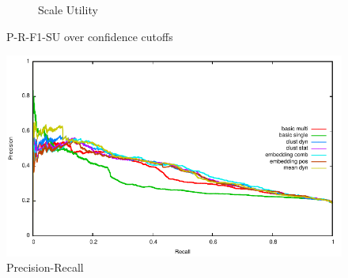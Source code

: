 \documentclass{sig-alternate}
\begin{document}
{{\begin{figure}[tb]
\begin{subfigure}[b]{\officialRunWidth}
			\caption{Scale Utility}
			\label{official:su}
    \end{subfigure}
\caption{P-R-F1-SU over confidence cutoffs}
\label{officialruns}
\end{figure}


\begin{figure}[tb]
\centering
\includegraphics[width=.5\textwidth]{fig/pr/overlapped.pdf}
\caption{Precision-Recall}
\label{precrecall}
\end{figure}

}}
\end{document}
